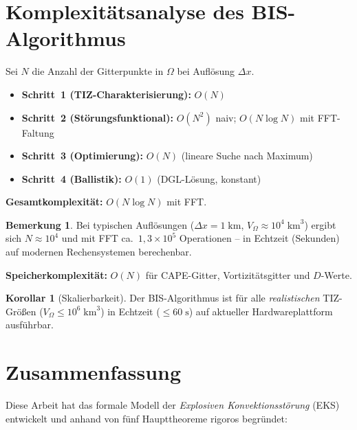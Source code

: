 ﻿\documentclass[a4paper,12pt]{article}
\theoremstyle{definition}
\newtheorem{bemerkung}{Bemerkung}
\newtheorem{korollar}{Korollar}
\begin{document}
\section{Komplexit\"{a}tsanalyse des BIS-Algorithmus}

Sei $N$ die Anzahl der Gitterpunkte in $\Omega$ bei Aufl\"{o}sung $\Delta x$.

\begin{itemize}
    \item \textbf{Schritt~1 (TIZ-Charakterisierung):} $O(N)$
    \item \textbf{Schritt~2 (St\"{o}rungsfunktional):}
          $O(N^{2})$ naiv; $O(N\log N)$ mit FFT-Faltung
    \item \textbf{Schritt~3 (Optimierung):} $O(N)$ (lineare Suche nach Maximum)
    \item \textbf{Schritt~4 (Ballistik):} $O(1)$ (DGL-L\"{o}sung, konstant)
\end{itemize}

\textbf{Gesamtkomplexit\"{a}t:} $O(N\log N)$ mit FFT.

\begin{bemerkung}
Bei typischen Aufl\"{o}sungen ($\Delta x=1\;\mathrm{km}$,
$V_{\Omega}\approx 10^{4}\;\mathrm{km}^{3}$) ergibt sich
$N\approx 10^{4}$ und mit FFT ca.\ $1{,}3\times 10^{5}$ Operationen --
in Echtzeit (Sekunden) auf modernen Rechensystemen berechenbar.
\end{bemerkung}

\textbf{Speicherkomplexit\"{a}t:} $O(N)$ f\"{u}r CAPE-Gitter, Vortizit\"{a}tsgitter
und $D$-Werte.

\begin{korollar}[Skalierbarkeit]
Der BIS-Algorithmus ist f\"{u}r alle \emph{realistischen} TIZ-Gr\"{o}\ss{}en
($V_{\Omega}\leq 10^{6}\;\mathrm{km}^{3}$)
in Echtzeit ($\leq 60\;\mathrm{s}$) auf aktueller Hardwareplattform
ausf\"{u}hrbar.
\end{korollar}

\section{Zusammenfassung}

Diese Arbeit hat das formale Modell der \emph{Explosiven Konvektionsst\"{o}rung}
(EKS) entwickelt und anhand von f\"{u}nf Haupttheoreme rigoros begr\"{u}ndet:
\end{document}
